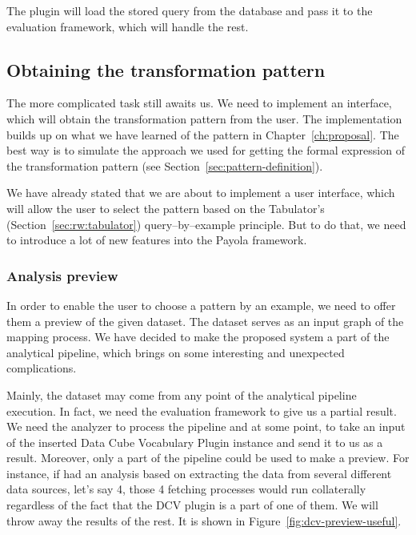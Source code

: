 The plugin will load the stored query from the database and pass it to the 
evaluation framework, which will handle the rest.

\subsection{Obtaining the transformation pattern}
The more complicated task still awaits us. We need to implement an interface, 
which will obtain the transformation pattern from the user. The implementation 
builds up on what we have learned of the pattern in Chapter~\ref{ch:proposal}.
The best way is to simulate the 
approach we used for getting the formal expression of the transformation pattern
(see Section~\ref{sec:pattern-definition}).

We have already stated that we are about to implement a user interface, which 
will allow the user to select the pattern based on the Tabulator's (Section~\ref{sec:rw:tabulator})
query--by--example principle. But to do that, we need to introduce a lot of new 
features into the Payola framework.

\subsubsection{Analysis preview}
In order to enable the user to choose a pattern by an example, we need to offer them a preview
of the given dataset. The dataset serves as an input graph of the mapping process. 
We have decided to make the proposed system a part of the analytical 
pipeline, which brings on some interesting and unexpected complications.

Mainly, the dataset may come from any point of the analytical pipeline execution. In 
fact, we need the evaluation framework to give us a partial result. We need the 
analyzer to process the pipeline and at some point, to take an input of the 
inserted Data Cube Vocabulary Plugin instance and send it to us as a result. 
Moreover, only a part of the pipeline could be used to make a preview. For instance, if had an analysis
based on extracting the data from several different data sources, 
let's say 4, those 4 fetching processes would run collaterally regardless of the 
fact that the DCV plugin is a part of one of them. We will throw away the 
results of the rest. It is shown in Figure~\ref{fig:dcv-preview-useful}.

